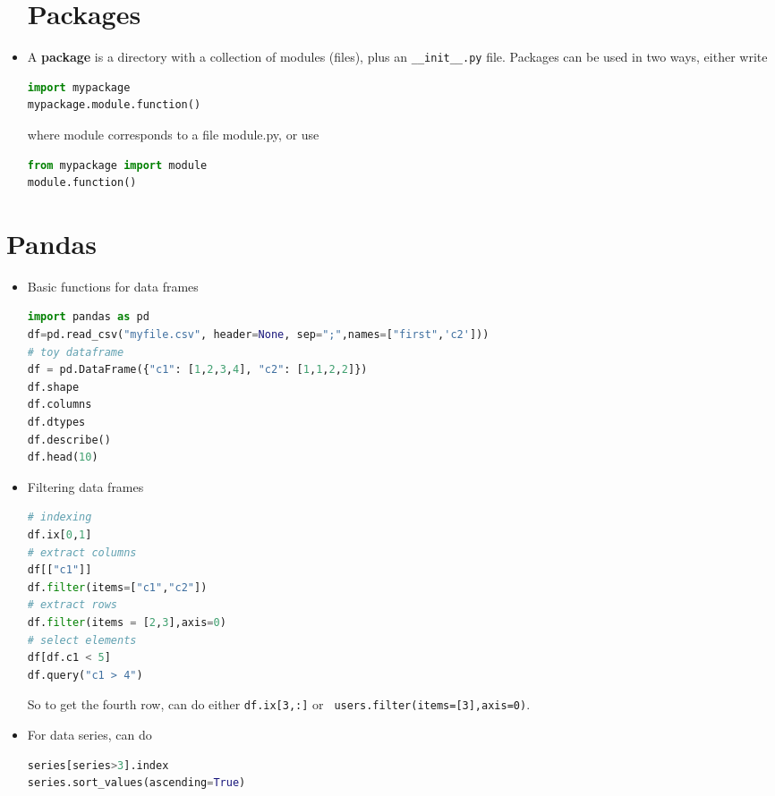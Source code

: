 \documentclass[11pt]{article}
\begin{document}
\begin{multicols*}{3}
\begin{itemize}[wide = 4pt, labelindent=\parindent]
  \section{Packages}
  
\item A \textbf{package} is a directory with a collection of modules (files), plus an  \verb+__init__.py+ file. Packages can be used in two ways, either write
  \vspace{2pt}
\begin{lstlisting}[language=Python,linewidth=0.95\linewidth]
import mypackage
mypackage.module.function()
\end{lstlisting}
where module corresponds to a file module.py, or use
\begin{lstlisting}[language=Python,linewidth=0.95\linewidth]
from mypackage import module
module.function()
\end{lstlisting}

\end{itemize}

\section{Pandas}
\begin{itemize}[wide = 4pt, labelindent=\parindent]
  \item Basic functions for data frames
\begin{lstlisting}[language=Python,linewidth=0.95\linewidth]
import pandas as pd
df=pd.read_csv("myfile.csv", header=None, sep=";",names=["first",'c2']))
# toy dataframe
df = pd.DataFrame({"c1": [1,2,3,4], "c2": [1,1,2,2]})
df.shape
df.columns
df.dtypes
df.describe()
df.head(10)
\end{lstlisting}

 \item Filtering data frames

\begin{lstlisting}[language=Python,linewidth=0.95\linewidth]    
# indexing
df.ix[0,1]
# extract columns
df[["c1"]]
df.filter(items=["c1","c2"])
# extract rows 
df.filter(items = [2,3],axis=0)
# select elements
df[df.c1 < 5]
df.query("c1 > 4")\end{lstlisting}

So to get the fourth row, can do either \verb+df.ix[3,:]+ or \verb+ users.filter(items=[3],axis=0)+. 

\item For data series, can do
\begin{lstlisting}[language=Python,linewidth=0.95\linewidth]
series[series>3].index
series.sort_values(ascending=True)
\end{lstlisting}
  

\end{itemize}
\end{multicols*}
\end{document}
